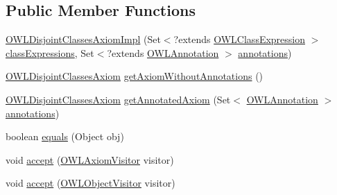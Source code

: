\subsection*{Public Member Functions}
\begin{DoxyCompactItemize}
\item 
\hyperlink{classuk_1_1ac_1_1manchester_1_1cs_1_1owl_1_1owlapi_1_1_o_w_l_disjoint_classes_axiom_impl_aa2efe4d8ec9ae6f892bbd0bf07b6d260}{O\-W\-L\-Disjoint\-Classes\-Axiom\-Impl} (Set$<$?extends \hyperlink{interfaceorg_1_1semanticweb_1_1owlapi_1_1model_1_1_o_w_l_class_expression}{O\-W\-L\-Class\-Expression} $>$ \hyperlink{classuk_1_1ac_1_1manchester_1_1cs_1_1owl_1_1owlapi_1_1_o_w_l_nary_class_axiom_impl_a1f49ad91a00e2548f99a93ca8de82f7c}{class\-Expressions}, Set$<$?extends \hyperlink{interfaceorg_1_1semanticweb_1_1owlapi_1_1model_1_1_o_w_l_annotation}{O\-W\-L\-Annotation} $>$ \hyperlink{classuk_1_1ac_1_1manchester_1_1cs_1_1owl_1_1owlapi_1_1_o_w_l_axiom_impl_af6fbf6188f7bdcdc6bef5766feed695e}{annotations})
\item 
\hyperlink{interfaceorg_1_1semanticweb_1_1owlapi_1_1model_1_1_o_w_l_disjoint_classes_axiom}{O\-W\-L\-Disjoint\-Classes\-Axiom} \hyperlink{classuk_1_1ac_1_1manchester_1_1cs_1_1owl_1_1owlapi_1_1_o_w_l_disjoint_classes_axiom_impl_ae604bee87d5bf298eb77a7728bbf377c}{get\-Axiom\-Without\-Annotations} ()
\item 
\hyperlink{interfaceorg_1_1semanticweb_1_1owlapi_1_1model_1_1_o_w_l_disjoint_classes_axiom}{O\-W\-L\-Disjoint\-Classes\-Axiom} \hyperlink{classuk_1_1ac_1_1manchester_1_1cs_1_1owl_1_1owlapi_1_1_o_w_l_disjoint_classes_axiom_impl_a7bda5d9ca203731e3540d2b13daf5f42}{get\-Annotated\-Axiom} (Set$<$ \hyperlink{interfaceorg_1_1semanticweb_1_1owlapi_1_1model_1_1_o_w_l_annotation}{O\-W\-L\-Annotation} $>$ \hyperlink{classuk_1_1ac_1_1manchester_1_1cs_1_1owl_1_1owlapi_1_1_o_w_l_axiom_impl_af6fbf6188f7bdcdc6bef5766feed695e}{annotations})
\item 
boolean \hyperlink{classuk_1_1ac_1_1manchester_1_1cs_1_1owl_1_1owlapi_1_1_o_w_l_disjoint_classes_axiom_impl_a3a258fa73efda7b2c604f9aafda0b43e}{equals} (Object obj)
\item 
void \hyperlink{classuk_1_1ac_1_1manchester_1_1cs_1_1owl_1_1owlapi_1_1_o_w_l_disjoint_classes_axiom_impl_ab3b68f48e55e7c54d14b60137c4b8379}{accept} (\hyperlink{interfaceorg_1_1semanticweb_1_1owlapi_1_1model_1_1_o_w_l_axiom_visitor}{O\-W\-L\-Axiom\-Visitor} visitor)
\item 
void \hyperlink{classuk_1_1ac_1_1manchester_1_1cs_1_1owl_1_1owlapi_1_1_o_w_l_disjoint_classes_axiom_impl_a3f9fb587fd0e5db3f50109381a94cf6f}{accept} (\hyperlink{interfaceorg_1_1semanticweb_1_1owlapi_1_1model_1_1_o_w_l_object_visitor}{O\-W\-L\-Object\-Visitor} visitor)

\end{DoxyCompactItemize}
